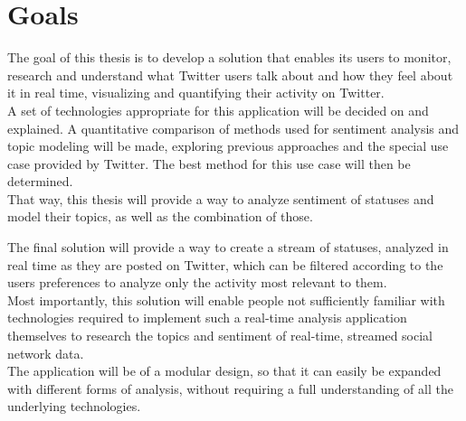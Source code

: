 \chapter{Goals}
\label{ch:goals}

The goal of this thesis is to develop a solution that enables its users to monitor,
research and understand what Twitter users talk about and how they feel about it in real time,
visualizing and quantifying their activity on Twitter.\\
A set of technologies appropriate for this application will be decided on and explained.
A quantitative comparison of methods used for sentiment analysis and topic modeling will be made,
exploring previous approaches and the special use case provided by Twitter.
The best method for this use case will then be determined.\\
That way, this thesis will provide a way to analyze sentiment of statuses and model their topics,
as well as the combination of those.

The final solution will provide a way to create a stream of statuses, analyzed in real time as they are posted on Twitter,
which can be filtered according to the users preferences to analyze only the activity most relevant to them.\\
Most importantly, this solution will enable people not sufficiently familiar with technologies required to
implement such a real-time analysis application themselves to research the topics and sentiment of real-time,
streamed social network data.\\
The application will be  of a modular design, so that it can easily be expanded with different forms of analysis,
without requiring a full understanding of all the underlying technologies.